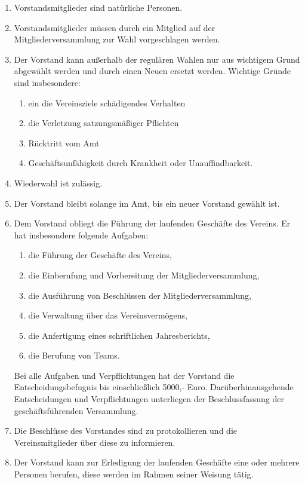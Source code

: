 \documentclass[german]{article}
\begin{document}
\begin{enumerate}
\begin{enumerate}
\item Vorstandsmitglieder sind natürliche Personen.

\item Vorstandsmitglieder müssen durch ein Mitglied auf der Mitgliederversammlung zur Wahl vorgeschlagen werden.

\item Der Vorstand kann außerhalb der regulären Wahlen nur aus wichtigem Grund abgewählt werden und durch einen Neuen ersetzt werden. Wichtige Gründe sind insbesondere:
\begin{enumerate}
\item ein die Vereinsziele schädigendes Verhalten
\item die Verletzung satzungsmäßiger Pflichten
\item Rücktritt vom Amt
\item Geschäftsunfähigkeit durch Krankheit oder Unauffindbarkeit.
\end{enumerate}
\item Wiederwahl ist zulässig.

\item Der Vorstand bleibt solange im Amt, bis ein neuer Vorstand gewählt ist.

\item Dem Vorstand obliegt die Führung der laufenden Geschäfte des Vereins. Er hat insbesondere folgende Aufgaben:
\begin{enumerate}
\item die Führung der Geschäfte des Vereins,
\item die Einberufung und Vorbereitung der Mitgliederversammlung,
\item die Ausführung von Beschlüssen der Mitgliederversammlung,
\item die Verwaltung über das Vereinsvermögens,
\item die Anfertigung eines schriftlichen Jahresberichts,
\item die Berufung von Teams.
\end{enumerate}
Bei alle Aufgaben und Verpflichtungen hat der Vorstand die Entscheidungsbefugnis bis einschließlich 5000,- Euro. Darüberhinausgehende Entscheidungen und Verpflichtungen unterliegen der Beschlussfassung der geschäftsführenden Versammlung.

\item Die Beschlüsse des Vorstandes sind zu protokollieren und die Vereinsmitglieder über diese zu informieren.

\item Der Vorstand kann zur Erledigung der laufenden Geschäfte eine oder mehrere Personen berufen, diese werden im Rahmen seiner Weisung tätig.


\end{enumerate}
\end{enumerate}
\end{document}

